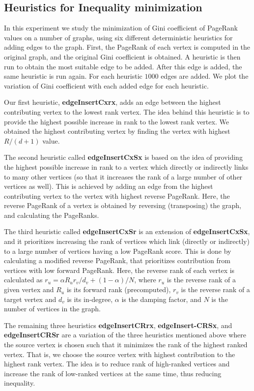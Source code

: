 \subsection{Heuristics for Inequality minimization}

In this experiment we study the minimization of Gini coefficient of PageRank values on a number of graphs, using six different deterministic heuristics for adding edges to the graph. First, the PageRank of each vertex is computed in the original graph, and the original Gini coefficient is obtained. A heuristic is then run to obtain the most suitable edge to be added. After this edge is added, the same heuristic is run again. For each heuristic $1000$ edges are added. We plot the variation of Gini coefficient with each added edge for each heuristic.

Our first heuristic, \textbf{edgeInsertCxrx}, adds an edge between the highest contributing vertex to the lowest rank vertex. The idea behind this heuristic is to provide the highest possible increase in rank to the lowest rank vertex. We obtained the highest contributing vertex by finding the vertex with highest $R/(d+1)$ value.

The second heuristic called \textbf{edgeInsertCxSx} is based on the idea of providing the highest possible increase in rank to a vertex which directly or indirectly links to many other vertices (so that it increases the rank of a large number of other vertices as well). This is achieved by adding an edge from the highest contributing vertex to the vertex with highest reverse PageRank. Here, the reverse PageRank of a vertex is obtained by reversing (transposing) the graph, and calculating the PageRanks.

The third heuristic called \textbf{edgeInsertCxSr} is an extension of \textbf{edgeInsertCxSx}, and it prioritizes increasing the rank of vertices which link (directly or indirectly) to a large number of vertices having a low PageRank score. This is done by calculating a modified reverse PageRank, that prioritizes contribution from vertices with low forward PageRank. Here, the reverse rank of each vertex is calculated as $r_u = \alpha R_u r_v / d_v + (1-\alpha)/N$, where $r_u$ is the reverse rank of a given vertex and $R_u$ is its forward rank (precomputed), $r_v$ is the reverse rank of a target vertex and $d_v$ is its in-degree, $\alpha$ is the damping factor, and $N$ is the number of vertices in the graph.

The remaining three heuristics \textbf{edgeInsertCRrx}, \textbf{edgeInsert-CRSx}, and \textbf{edgeInsertCRSr} are a variation of the three heuristics mentioned above where the source vertex is chosen such that it minimizes the rank of the highest ranked vertex. That is, we choose the source vertex with highest contribution to the highest rank vertex. The idea is to reduce rank of high-ranked vertices and increase the rank of low-ranked vertices at the same time, thus reducing inequality.


